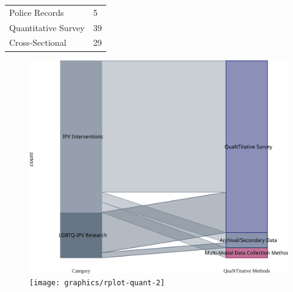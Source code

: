 \documentclass[]{tufte-handout}
\begin{document}
\begin{longtable}[]{@{}ll@{}}
\begin{minipage}[t]{0.51\columnwidth}\raggedright\strut
Police Records\strut
\end{minipage} & \begin{minipage}[t]{0.21\columnwidth}\raggedright\strut
5\strut
\end{minipage}\tabularnewline
\begin{minipage}[t]{0.51\columnwidth}\raggedright\strut
Quantitative Survey\strut
\end{minipage} & \begin{minipage}[t]{0.21\columnwidth}\raggedright\strut
39\strut
\end{minipage}\tabularnewline
\begin{minipage}[t]{0.51\columnwidth}\raggedright\strut
Cross-Sectional\strut
\end{minipage} & \begin{minipage}[t]{0.21\columnwidth}\raggedright\strut
29\strut
\end{minipage}\tabularnewline
\bottomrule
\end{longtable}

\begin{figure}
\includegraphics[width=\linewidth]{graphics/rplot-quant-1} \texttt{[image: graphics/rplot-quant-2]} \end{figure}

\newpage

\end{document}

